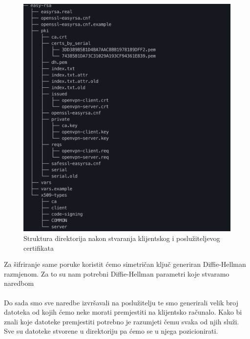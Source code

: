         \begin{figure}[H]
            \centering
            \includegraphics[scale=0.5]{slike/afterClientAndServerCert}
            \caption{Struktura direktorija nakon stvaranja klijentskog i
            poslužiteljevog certifikata}
        \end{figure}

        \noindent
        Za šifriranje same poruke koristit ćemo simetričan ključ generiran
        Diffie-Hellman razmjenom. Za to su nam potrebni Diffie-Hellman
        parametri koje stvaramo naredbom \\

        \noindent
         \\


        \noindent
        Do sada smo sve naredbe izvršavali na poslužitelju te smo generirali
        velik broj datoteka od kojih ćemo neke morati premjestiti na klijentsko
        računalo. Kako bi znali koje datoteke premjestiti potrebno je razumjeti
        čemu svaka od njih služi. Sve su datoteke stvorene u
        direktoriju pa ćemo se u njega pozicionirati. \\

